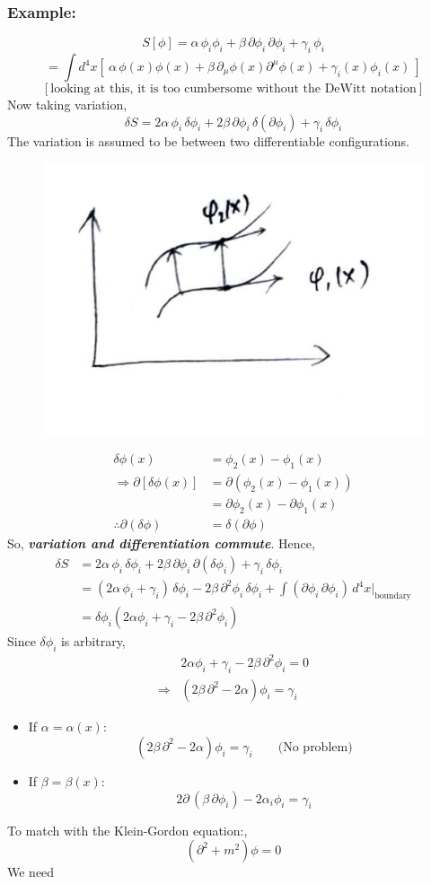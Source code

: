 \documentclass[14pt]{article} %
\begin{document}
\subsubsection*{Example:}
\[
S[\phi] = \alpha\, \phi_i \phi_i + \beta\, \partial \phi_i \, \partial \phi_i + \gamma_i\, \phi_i
\]
\[
= \int d^4x \left[~ \alpha \, \phi(x)\phi(x) + \beta \, \partial_\mu \phi(x) \partial^\mu \phi(x) + \gamma_i(x) \phi_i(x) ~\right]
\]
\[
[ \text{looking at this, it is too cumbersome without the DeWitt notation} ]
\]
Now taking variation,
\[
\delta S = 2\alpha\, \phi_i\, \delta \phi_i + 2\beta \, \partial \phi_i \, \delta(\partial \phi_i) + \gamma_i \,\delta \phi_i
\]
The variation is assumed to be between two differentiable configurations.
\begin{figure}[H]
    \centering
    \includegraphics[width=0.4\linewidth]{L5_3.jpeg}
    \caption*{}
\end{figure}
\vspace{-1.5cm}
\begin{align*}
\delta \phi(x) &= \phi_2(x) - \phi_1(x) \\
\Rightarrow \partial \left[ \delta \phi(x) \right] &= \partial (\phi_2(x) - \phi_1(x)) \\
&= \partial \phi_2(x) - \partial \phi_1(x) \\ 
\therefore \partial(\delta \phi) &= \delta (\partial \phi)
\end{align*}
So, \textbf{\textit{variation and differentiation commute}}. Hence,
\begin{align*}
\delta S &= 2\alpha\, \phi_i\, \delta \phi_i + 2\beta \, \partial \phi_i \, \partial(\delta \phi_i) + \gamma_i \,\delta \phi_i \\
&= (2\alpha \,\phi_i + \gamma_i)\,\delta \phi_i - 2\beta \, \partial^2 \phi_i \, \delta \phi_i + \int (\partial \phi_i \, \partial \phi_i) \, d^4x \bigg|_{\text{boundary}} \\
&= \delta \phi_i \left( 2\alpha \phi_i + \gamma_i - 2\beta \, \partial^2 \phi_i \right)
\end{align*}
Since $\delta \phi_i$ is arbitrary,
\begin{align*}
& 2\alpha \phi_i + \gamma_i - 2\beta \, \partial^2 \phi_i = 0 \\
\Rightarrow & (2\beta \, \partial^2 - 2\alpha) \phi_i = \gamma_i
\end{align*}
\begin{itemize}
\item If $\alpha = \alpha(x)$:
\[
(2\beta \, \partial^2 - 2\alpha) \phi_i = \gamma_i
\quad \quad \text{(No problem)}\]
\item If $\beta = \beta(x)$:
\[
2 \partial\,(\beta \, \partial \phi_i) - 2\alpha_i \phi_i = \gamma_i
\]
\end{itemize} 
To match with the Klein-Gordon equation:,
\[
(\partial^2 + m^2)\phi = 0
\]
We need
\end{document}
